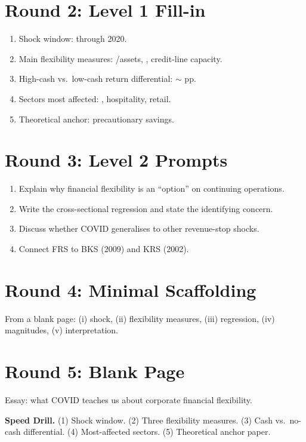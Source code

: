 \documentclass[11pt]{article}
\newcommand{\blank}[1]{\underline{\hspace{#1}}}
\begin{document}
\section*{Round 2: Level 1 Fill-in}
\begin{enumerate}
\item Shock window: \blank{1cm} through \blank{1cm} 2020.
\item Main flexibility measures: \blank{1cm}/assets, \blank{1cm}, credit-line capacity.
\item High-cash vs.\ low-cash return differential: $\sim$\blank{1cm} pp.
\item Sectors most affected: \blank{1.5cm}, hospitality, retail.
\item Theoretical anchor: \blank{1cm} precautionary savings.
\end{enumerate}

\section*{Round 3: Level 2 Prompts}
\begin{enumerate}
\item Explain why financial flexibility is an ``option'' on continuing operations.
\item Write the cross-sectional regression and state the identifying concern.
\item Discuss whether COVID generalises to other revenue-stop shocks.
\item Connect FRS to BKS (2009) and KRS (2002).
\end{enumerate}

\section*{Round 4: Minimal Scaffolding}
From a blank page: (i) shock, (ii) flexibility measures, (iii) regression, (iv) magnitudes, (v) interpretation.

\section*{Round 5: Blank Page}
Essay: what COVID teaches us about corporate financial flexibility.

\vspace{6pt}
\begin{drillbox}
\textbf{Speed Drill.} (1) Shock window. (2) Three flexibility measures. (3) Cash vs.\ no-cash differential. (4) Most-affected sectors. (5) Theoretical anchor paper.
\end{drillbox}
\end{document}
